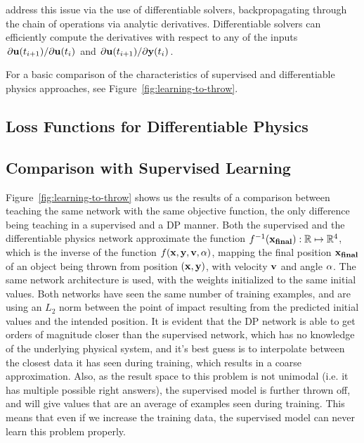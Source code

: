 \cite{holl2019pdecontrol} address this issue via the use of differentiable
solvers, backpropagating through the chain of operations via analytic
derivatives.  Differentiable solvers can efficiently compute the derivatives
with respect to any of the inputs $\pdv*{\vb{u}(t_{i+1})}{\vb{u}(t_i)}$ and
$\pdv*{\vb{u}(t_{i+1})}{\vb{y}(t_i)}$. 

For a basic comparison of the characteristics of supervised and differentiable
physics approaches, see Figure~\ref{fig:learning-to-throw}.

\subsection{Loss Functions for Differentiable Physics}
\label{dp-loss}


\subsection{Comparison with Supervised Learning}
Figure~\ref{fig:learning-to-throw} shows us the results of a comparison between
teaching the same network with the same objective function, the only difference
being teaching in a supervised and a \ac{DP} manner.  Both the supervised and
the differentiable physics network approximate the function
$f^{-1}(\vb{x_{final}}): \mathbb{R} \mapsto \mathbb{R}^4$, which is the inverse
of the function $f(\vb{x}, \vb{y}, \vb{v}, \vb{\alpha})$, mapping the final
position $\vb{x_{final}}$ of an object being thrown from position $(\vb{x},
\vb{y})$, with velocity $\vb{v}$ and angle $\vb{\alpha}$. The same network
architecture is used, with the weights initialized to the same initial values.
Both networks have seen the same number of training examples, and are using an
$L_2$ norm between the point of impact resulting from the predicted initial
values and the intended position. It is evident that the DP network is able to
get orders of magnitude closer than the supervised network, which has no
knowledge of the underlying physical system, and it's best guess is to
interpolate between the closest data it has seen during training, which results
in a coarse approximation. Also, as the result space to this problem is not
unimodal (i.e. it has multiple possible right answers), the supervised model is
further thrown off, and will give values that are an average of examples seen
during training. This means that even if we increase the training data, the
supervised model can never learn this problem properly.  

